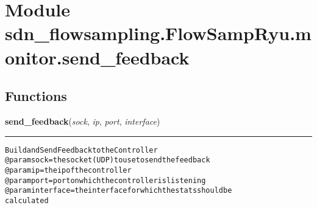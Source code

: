 %
%
%


\section{Module sdn\_flowsampling.FlowSampRyu.monitor.send\_feedback}

    \label{sdn_flowsampling:FlowSampRyu:monitor:send_feedback}


  \subsection{Functions}

    \label{sdn_flowsampling:FlowSampRyu:monitor:send_feedback:send_feedback}

    \vspace{0.5ex}

\hspace{.8\funcindent}\begin{boxedminipage}{\funcwidth}

    \raggedright \textbf{send\_feedback}(\textit{sock}, \textit{ip}, \textit{port}, \textit{interface})

    \vspace{-1.5ex}

    \rule{\textwidth}{0.5\fboxrule}
\setlength{\parskip}{2ex}
\begin{alltt}
Build and Send Feedback to the Controller
@param sock = the socket (UDP) to use to send the feedback
@param ip = the ip of the controller
@param port = port on which the controller is listening
@param interface = the interface for which the stats should be
                   calculated
\end{alltt}

\setlength{\parskip}{1ex}
    \end{boxedminipage}

